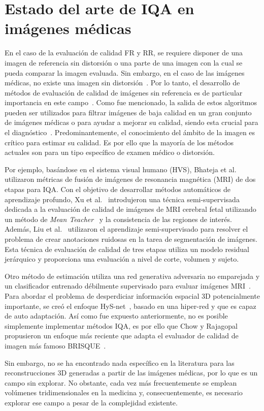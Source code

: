 \section{Estado del arte de IQA en imágenes médicas}
En el caso de la evaluación de calidad FR y RR, se requiere disponer 
de una imagen de referencia sin distorsión o una parte de una imagen con la cual 
se pueda comparar la imagen evaluada. Sin embargo, en el caso de las imágenes médicas, 
no existe una imagen sin distorsión~\cite{DicomDistortionsExample}. 
Por lo tanto, el desarrollo de métodos de evaluación de calidad de imágenes 
sin referencia es de particular importancia en este campo~\cite{LGP, BRISQUE, IQA-CNN, DIQaM, Hallucinated-IQA}.
Como fue mencionado, la salida de estos algoritmos pueden ser utilizados 
para filtrar imágenes de baja calidad en un gran conjunto de imágenes médicas o 
para ayudar a mejorar su calidad, siendo esta crucial para el diagnóstico~\cite{DicomDistortionsExample}.
Predominantemente, el conocimiento del ámbito de la imagen es crítico para estimar 
su calidad. Es por ello que la mayoría de los métodos actuales son para un tipo específico 
de examen médico o distorsión.

Por ejemplo, basándose en el sistema visual humano (HVS), 
Bhateja et al.~\cite{MultiModalMRIFusionMethod} utilizaron métricas de fusión
de imágenes de resonancia magnética (MRI) de dos etapas para IQA.
Con el objetivo de desarrollar métodos automáticos de aprendizaje profundo,
Xu et al.~\cite{SemiSupervisedMRIFetalBrain} introdujeron una técnica semi-supervisada dedicada a la evaluación de 
calidad de imágenes de MRI cerebral fetal utilizando un método de 
\emph{Mean Teacher}~\cite{MeanTeacher} y la consistencia de las regiones de interés. 
Además, Liu et al.~\cite{IQAForPediatricMRIWithNoisySegmentation} utilizaron el aprendizaje semi-supervisado para resolver 
el problema de crear anotaciones ruidosas en la tarea de segmentación de imágenes. 
Esta técnica de evaluación de calidad de tres etapas utiliza un modelo residual 
jerárquico y proporciona una evaluación a nivel de corte, volumen y sujeto. 

Otro método de estimación utiliza una red generativa adversaria no emparejada 
y un clasificador entrenado débilmente supervisado para evaluar imágenes MRI~\cite{MIGAN}.
Para abordar el problema de desperdiciar información espacial 3D potencialmente importante, 
se creó el enfoque HyS-net~\cite{Hys-net}, basado en una hiper-red y que es capaz de 
auto adaptación. Así como fue expuesto anteriormente, no es posible 
simplemente implementar métodos IQA, es por ello que Chow y Rajagopal~\cite{MedicalBRISQUE} 
propusieron un enfoque más reciente que adapta el evaluador de calidad de imagen más famoso BRISQUE~\cite{BRISQUE}.

Sin embargo, no se ha encontrado nada específico en la literatura para las 
reconstrucciones 3D generadas a partir de las imágenes médicas, por lo que es un campo sin explorar. 
No obstante, cada vez más frecuentemente se emplean 
volúmenes tridimensionales en la medicina y, consecuentemente, es necesario explorar ese 
campo a pesar de la complejidad existente.
